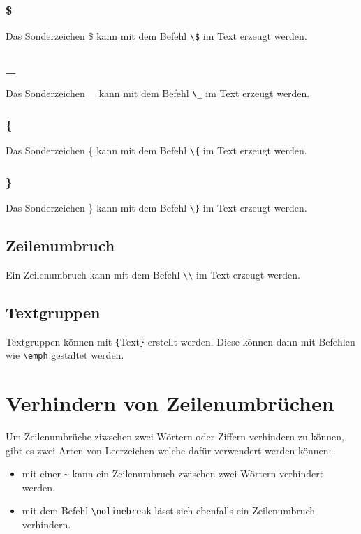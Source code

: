 \documentclass[
12pt,
ngerman
]{scrreprt}
\begin{document}
\subsubsection{\$}
Das Sonderzeichen \$ kann mit dem Befehl \verb!\$! im Text erzeugt werden.

\subsubsection{\_}
Das Sonderzeichen \_ kann mit dem Befehl \verb!\_! im Text erzeugt werden.

\subsubsection{\{}
Das Sonderzeichen \{ kann mit dem Befehl \verb!\{! im Text erzeugt werden.

\subsubsection{\}}
Das Sonderzeichen \} kann mit dem Befehl \verb!\}! im Text erzeugt werden.

\subsection{Zeilenumbruch}
\label{subsec:linebreak}
Ein Zeilenumbruch kann mit dem Befehl \verb!\\! im Text erzeugt werden.

\subsection{Textgruppen}
\label{subsec:textgroups}
Textgruppen können mit \verb!{!Text\verb!}! erstellt werden. Diese können dann mit Befehlen wie \verb!\emph! gestaltet werden.

\section{Verhindern von Zeilenumbrüchen}
\label{sec:no-linebreak}
Um Zeilenumbrüche ziwschen zwei Wörtern oder Ziffern verhindern zu können, gibt es zwei Arten von Leerzeichen welche dafür verwendert werden können:
\begin{itemize}
  \item mit einer \verb!~! kann ein Zeilenumbruch zwischen zwei Wörtern verhindert werden.
  \item mit dem Befehl \verb!\nolinebreak! lässt sich ebenfalls ein Zeilenumbruch verhindern.
\end{itemize}
\end{document}
